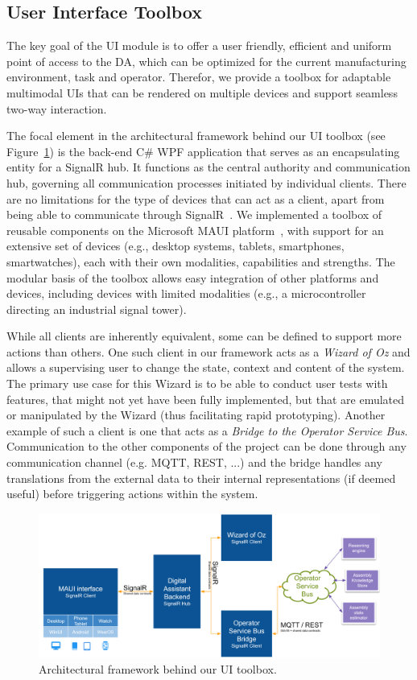 \subsection{User Interface Toolbox}\label{sec:UI}
The key goal of the UI module is to offer a user friendly, efficient and uniform point of access to the DA, which can be optimized for the current manufacturing environment, task and operator. Therefor, we provide a toolbox for adaptable multimodal UIs that can be rendered on multiple devices and support seamless two-way interaction.

The focal element in the architectural framework behind our UI toolbox (see Figure~\ref{fig:ui-architecture}) is the back-end C\# WPF application that serves as an encapsulating entity for a SignalR hub. It functions as the central authority and communication hub, governing all communication processes initiated by individual clients. There are no limitations for the type of devices that can act as a client, apart from being able to communicate through SignalR~\cite{SignalR01,Sharma_2023}. We implemented a toolbox of reusable components on the Microsoft MAUI platform~\cite{Maui01,Maui02}, with support for an extensive set of devices (e.g., desktop systems, tablets, smartphones, smartwatches), each with their own modalities, capabilities and strengths. The modular basis of the toolbox allows easy integration of other platforms and devices, including devices with limited modalities (e.g., a microcontroller directing an industrial signal tower).

While all clients are inherently equivalent, some can be defined to support more actions than others. One such client in our framework acts as a \emph{Wizard of Oz} and allows a supervising user to change the state, context and content of the system. The primary use case for this Wizard is to be able to conduct user tests with features, that might not yet have been fully implemented, but that are emulated or manipulated by the Wizard (thus facilitating rapid prototyping).
Another example of such a client is one that acts as a \emph{Bridge to the Operator Service Bus}. Communication to the other components of the project can be done through any communication channel (e.g. MQTT, REST, ...) and the bridge handles any translations from the external data to their internal representations (if deemed useful) before triggering actions within the system.

\begin{figure}
    \centering
    \includegraphics[width=1\linewidth]{figs/UI-architecture.png}
    \caption{Architectural framework behind our UI toolbox.}
    \label{fig:ui-architecture}
\end{figure}

